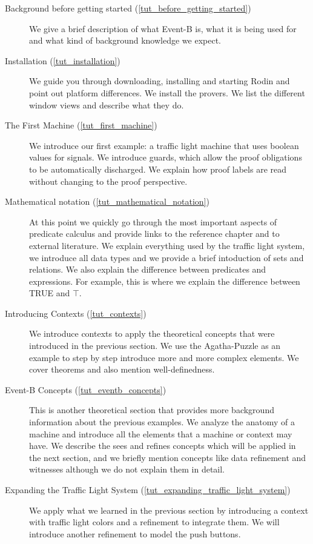 \begin{description}
	\item[Background before getting started (\ref{tut_before_getting_started})] We give a brief description of what Event-B is, what it is being used for and what kind of background knowledge we expect.
	\item[Installation (\ref{tut_installation})] We guide you through downloading, installing and starting Rodin and point out platform differences.  We install the provers.  We list the different window views and describe what they do.
	\item[The First Machine (\ref{tut_first_machine})] We introduce our first example: a traffic light machine that uses boolean values for signals.  We introduce guards, which allow the proof obligations to be automatically discharged.  We explain how proof labels are read without changing to the proof perspective.
	\item[Mathematical notation (\ref{tut_mathematical_notation})] At this point we quickly go through the most important aspects of predicate calculus and provide links to the reference chapter and to external literature.  We explain everything used by the traffic light system, we introduce all data types and we provide a brief intoduction of sets and relations.  We also explain the difference between predicates and expressions. For example, this is where we explain the difference between TRUE and $\top$.  
	\item[Introducing Contexts (\ref{tut_contexts})] We introduce contexts to apply the theoretical concepts that were introduced in the previous section.  We use the Agatha-Puzzle as an example to step by step introduce more and more complex elements.  We cover theorems and also mention well-definedness.
	\item[Event-B Concepts (\ref{tut_eventb_concepts})] This is another theoretical section that provides more background information about the previous examples.  We analyze the anatomy of a machine and introduce all the elements that a machine or context may have. We describe the sees and refines concepts which will be applied in the next section, and we briefly mention concepts like data refinement and witnesses although we do not explain them in detail.
	\item[Expanding the Traffic Light System (\ref{tut_expanding_traffic_light_system})]  We apply what we learned in the previous section by introducing a context with traffic light colors and a refinement to integrate them.  We will introduce another refinement to model the push buttons.

\end{description}

